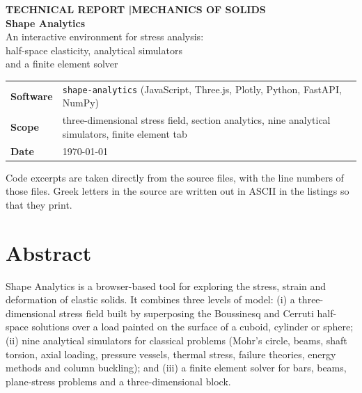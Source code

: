 \documentclass[11pt,a4paper,twoside]{report}
\newcommand{\frontmatter}{\pagenumbering{roman}}
\begin{document}
\pagestyle{empty}
\begin{titlepage}
\vspace*{1.6cm}
{\color{white}\sffamily
{\large\bfseries TECHNICAL REPORT \quad|\quad MECHANICS OF SOLIDS}\\[1.6cm]
{\fontsize{44}{48}\selectfont\bfseries Shape Analytics}\\[0.7cm]
{\Large An interactive environment for stress analysis:\\ half-space elasticity, analytical simulators\\ and a finite element solver}\par}
\vspace{4.2cm}
{\sffamily\large
\begin{tabular}{@{}p{3.2cm}p{10cm}@{}}
\textbf{Software} & \texttt{shape-analytics} (JavaScript, Three.js, Plotly, Python, FastAPI, NumPy)\\[3pt]
\textbf{Scope} & three-dimensional stress field, section analytics, nine analytical simulators, finite element tab\\[3pt]
\textbf{Date} & \today\\
\end{tabular}}
\vfill
{\small\sffamily\color{gray}Code excerpts are taken directly from the source files, with the line numbers of those files. Greek letters in the source are written out in ASCII in the listings so that they print.}
\end{titlepage}
\pagestyle{fancy}
\frontmatter
\chapter*{Abstract}
Shape Analytics is a browser-based tool for exploring the stress, strain and deformation of elastic solids. It combines three levels of model: (i) a three-dimensional stress field built by superposing the Boussinesq and Cerruti half-space solutions over a load painted on the surface of a cuboid, cylinder or sphere; (ii) nine analytical simulators for classical problems (Mohr's circle, beams, shaft torsion, axial loading, pressure vessels, thermal stress, failure theories, energy methods and column buckling); and (iii) a finite element solver for bars, beams, plane-stress problems and a three-dimensional block.
\end{document}
